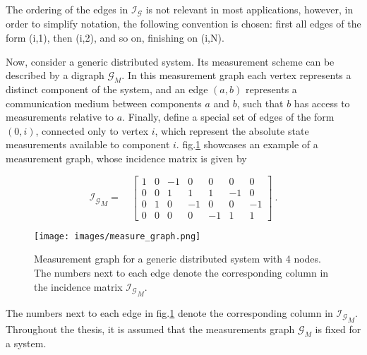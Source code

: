 The ordering of the edges in $\mathcal{I_\mathcal{G}}$ is not relevant in most applications, however, in order to simplify notation, the following convention is chosen: first all edges of the form (i,1), then (i,2), and so on, finishing on (i,N).
\par
Now, consider a generic distributed system. Its measurement scheme can be described by a digraph $\mathcal{G}_M$. In this measurement graph each vertex represents a distinct component of the system, and an edge $(a,b)$ represents a communication medium between components $a$ and $b$, such that $b$ has access to measurements relative to $a$. Finally, define a special set of edges of the form $(0,i)$, connected only to vertex $i$, which represent the absolute state measurements available to component $i$. fig.\ref{fig:measure_graph} showcases an example of a measurement graph, whose incidence matrix is given by 

%
\begin{equation*}
    \mathcal{I_\mathcal{G}}_M =
    \quad
    \begin{bmatrix}
    1 & 0 & -1 & 0 & 0 & 0 & 0\\
    0 & 0 &  1 & 1 & 1 & -1 & 0\\
    0 & 1 &  0 & -1 & 0 & 0 & -1\\
    0 & 0 & 0 & 0 & -1 & 1 & 1
    \end{bmatrix} \ .
\end{equation*}

\begin{figure}[h]
  \centering
  \texttt{[image: images/measure\_graph.png]}
  \caption{Measurement graph for a generic distributed system with 4 nodes. The numbers next to each edge denote the corresponding column in the incidence matrix $\mathcal{I_\mathcal{G}}_M$.}
  \label{fig:measure_graph}
\end{figure}
%

The numbers next to each edge in fig.\ref{fig:measure_graph} denote the corresponding column in $\mathcal{I_\mathcal{G}}_M$.
Throughout the thesis, it is assumed that the measurements graph $\mathcal{G}_M$ is fixed for a system. 

